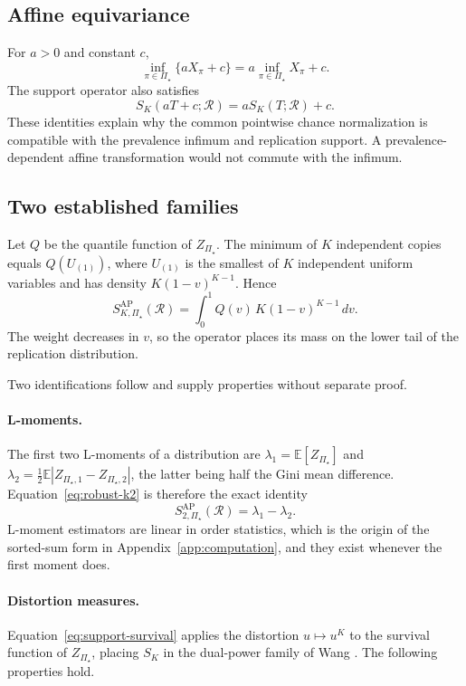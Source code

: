 \documentclass[11pt]{article}
\newcommand{\Regime}{\mathcal{R}}
\newcommand{\PSet}{\Pi_\star}
\newcommand{\E}{\mathbb{E}}
\theoremstyle{remark}
\begin{document}
\subsection{Affine equivariance}

For $a>0$ and constant $c$,
\[
\inf_{\pi\in\PSet}\{aX_\pi+c\}
=
a\inf_{\pi\in\PSet}X_\pi+c.
\]
The support operator also satisfies
\[
S_K(aT+c;\Regime)
=
aS_K(T;\Regime)+c.
\]
These identities explain why the common pointwise chance normalization is compatible with the prevalence infimum and replication support. A prevalence-dependent affine transformation would not commute with the infimum.

\subsection{Two established families}
\label{app:families}

Let $Q$ be the quantile function of $Z_{\PSet}$. The minimum of $K$ independent copies equals $Q(U_{(1)})$, where $U_{(1)}$ is the smallest of $K$ independent uniform variables and has density $K(1-v)^{K-1}$. Hence
\begin{equation}
S_{K,\PSet}^{\mathrm{AP}}(\Regime)
=
\int_0^1
Q(v)\,K(1-v)^{K-1}\,dv.
\label{eq:quantile-weight}
\end{equation}
The weight decreases in $v$, so the operator places its mass on the lower tail of the replication distribution.

Two identifications follow and supply properties without separate proof.

\paragraph{L-moments.}
The first two L-moments of a distribution \cite{hosking1990lmoments} are $\lambda_1=\E[Z_{\PSet}]$ and $\lambda_2=\tfrac12\E|Z_{\PSet,1}-Z_{\PSet,2}|$, the latter being half the Gini mean difference. Equation~\eqref{eq:robust-k2} is therefore the exact identity
\[
S_{2,\PSet}^{\mathrm{AP}}(\Regime)
=
\lambda_1-\lambda_2 .
\]
L-moment estimators are linear in order statistics, which is the origin of the sorted-sum form in Appendix~\ref{app:computation}, and they exist whenever the first moment does.

\paragraph{Distortion measures.}
Equation~\eqref{eq:support-survival} applies the distortion $u\mapsto u^{K}$ to the survival function of $Z_{\PSet}$, placing $S_K$ in the dual-power family of Wang \cite{wang1996premium}. The following properties hold.
\end{document}
